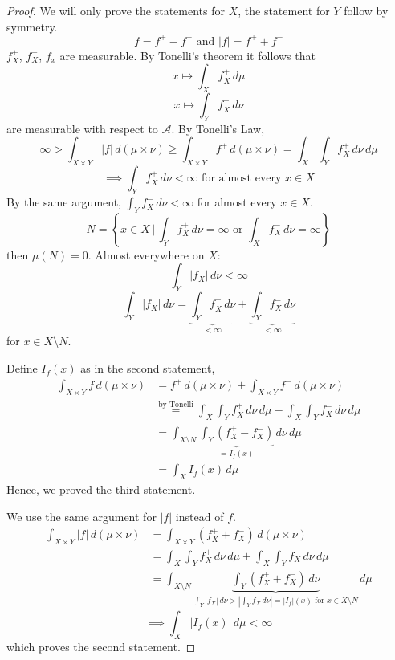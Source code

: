\documentclass{article}
\newcommand{\setdef}[2]{\left\{\left.#1\,\right|\,#2\right\}}
\newcommand{\card}[1]{\left|#1\right|}
\newcommand{\mtn}{(\mu\times\nu)} %
\begin{document}
\begin{proof}
  We will only prove the statements for $X$, the statement for $Y$ follow by symmetry.
  \[ f = f^+ - f^- \text{ and } \card{f} = f^+ + f^- \]
  $f_X^+$, $f_X^-$, $f_x$ are measurable.
  By Tonelli's theorem it follows that
  \[ x \mapsto \int_X f_X^+ \, d\mu \]
  \[ x \mapsto \int_Y f_X^+ \, d\nu \]
  are measurable with respect to $\mathcal A$. By Tonelli's Law,
  \[ \infty > \int_{X \times Y} \card{f} \, d\mtn \geq \int_{X\times Y} f^+ \, d\mtn = \int_X \int_Y f_X^+ \, d\nu \, d\mu \]
  \[ \implies \int_Y f_X^+ \, d\nu < \infty \text{ for almost every } x \in X \]
  By the same argument, $\int_Y f_X^- \, d\nu < \infty$ for almost every $x \in X$.
  \[ N = \setdef{x \in X}{\int_Y f_X^+ \, d\nu = \infty \text{ or } \int_X f_X^- \, d\nu = \infty} \]
  then $\mu(N) = 0$. Almost everywhere on $X$:
  \[ \int_Y \card{f_X} \, d\nu < \infty \]
  \[ \int_Y \card{f_X} \, d\nu = \underbrace{\int_Y f_X^+ \, d\nu}_{<\infty} + \underbrace{\int_Y f_X^- \, d\nu}_{<\infty} \]
  for $x \in X \setminus N$.

  Define $I_f(x)$ as in the second statement,
  \begin{align*}
    \int_{X\times Y} f \, d\mtn
      &= f^+ \, d\mtn + \int_{X\times Y} f^- \, d\mtn \\
      &\stackrel{\text{by Tonelli}}= \int_X \int_Y f_X^+ \, d\nu \, d\mu - \int_X \int_Y f^-_X \, d\nu \, d\mu \\
      &= \int_{X \setminus N} \underbrace{\int_Y (f_X^+ - f_X^-)}_{=I_f(x)} \, d\nu \, d\mu \\
      &= \int_X I_f(x) \, d\mu
  \end{align*}
  Hence, we proved the third statement.

  We use the same argument for $\card{f}$ instead of $f$.
  \begin{align*}
    \int_{X\times Y} \card{f} \, d\mtn
      &= \int_{X\times Y} \left(f_X^+ + f_X^-\right) \, d\mtn \\
      &= \int_X \int_Y f_X^+ \, d\nu \, d\mu + \int_X \int_Y f_X^- \, d\nu \, d\mu \\
      &= \int_{X\setminus N} \underbrace{\int_Y \left(f_X^+ + f_X^-\right) \, d\nu}_{\int_Y \card{f_X} \, d\nu > \card{\int_Y f_X \, d\nu} = \card{I_f}(x) \text{ for } x \in X \setminus N} \, d\mu
  \end{align*}
  \[ \implies \int_X \card{I_f(x)} \, d\mu < \infty \]
  which proves the second statement.
\end{proof}
\end{document}
